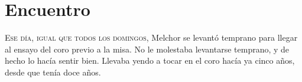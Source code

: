 

\chapter{Encuentro}
\lettrine{E}{se día, igual que todos los domingos,} Melchor se levantó temprano para llegar al ensayo del coro previo a la misa. No le molestaba levantarse temprano, y de hecho lo hacía sentir bien.
Llevaba yendo a tocar en el coro hacía ya cinco años, desde que tenía doce años.











